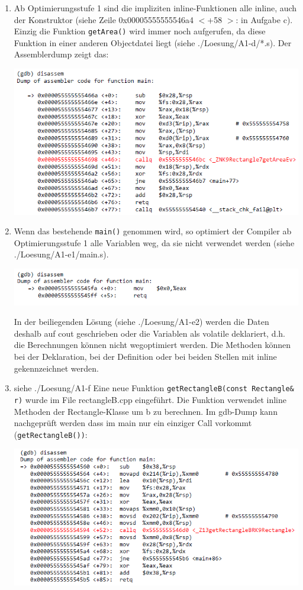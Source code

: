 \begin{enumerate}
  \item Ab Optimierungsstufe 1 sind die impliziten inline-Funktionen alle inline, auch der Konstruktor (siehe Zeile 0x00005555555546a4 $<$+58 $>$: in Aufgabe c). Einzig die Funktion \texttt{getArea()} wird immer noch aufgerufen, da diese Funktion in einer anderen Objectdatei liegt (siehe ./Loesung/A1-d/*.s). Der Assemblerdump zeigt das:

\begin{center}
  \includegraphics[width=.8\linewidth]{900-Praktika/prak07/4.PNG}
\end{center}

  \item Wenn das bestehende \texttt{main()} genommen wird, so optimiert der Compiler ab Optimierungsstufe 1 alle Variablen weg, da sie nicht verwendet werden (siehe ./Loesung/A1-e1/main.s).

\begin{center}
  \includegraphics[width=.8\linewidth]{900-Praktika/prak07/7.PNG}
\end{center}

  In der beiliegenden Lösung (siehe ./Loesung/A1-e2) werden die Daten deshalb auf cout geschrieben oder die Variablen als volatile deklariert, d.h. die Berechnungen können nicht wegoptimiert werden. Die Methoden können bei der Deklaration, bei der Definition oder bei beiden Stellen mit inline gekennzeichnet werden.
  \item siehe ./Loesung/A1-f Eine neue Funktion \texttt{getRectangleB(const Rectangle\& r)} wurde im File rectangleB.cpp eingeführt. Die Funktion verwendet inline Methoden der Rectangle-Klasse um b zu berechnen. Im gdb-Dump kann nachgeprüft werden dass im main nur ein einziger Call vorkommt (\texttt{getRectangleB())}:

\begin{center}
  \includegraphics[width=.8\linewidth]{900-Praktika/prak07/5.PNG}
\end{center}


\end{enumerate}
